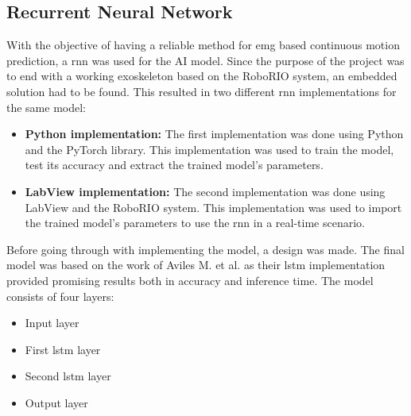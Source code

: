 \subsection{Recurrent Neural Network}
With the objective of having a reliable method for \acrshort{emg} based continuous motion prediction, a \acrshort{rnn} was used for the AI model. 
Since the purpose of the project was to end with a working exoskeleton based 
on the RoboRIO system, an embedded solution had to be found. This resulted in two different \acrshort{rnn} 
implementations for the same model:
\begin{itemize}

    \item \textbf{Python implementation:} The first implementation was done using Python and the PyTorch library. 
    This implementation was used to train the model, test its accuracy and extract the trained model's parameters.
    
    \item \textbf{LabView implementation:} The second implementation was done using LabView and the RoboRIO system. 
    This implementation was used to import the trained model's parameters to use the \acrshort{rnn} in a real-time scenario.

\end{itemize}

Before going through with implementing the model, a design was made. The final model was based on the work of Aviles M. et al. \cite{RNNEMG} 
as their \acrfull{lstm} implementation provided promising results both in accuracy and inference time. The model consists 
of four layers:
\begin{itemize}

    \item Input layer

    \item First \acrshort{lstm} layer

    \item Second \acrshort{lstm} layer
    
    \item Output layer

\end{itemize}

